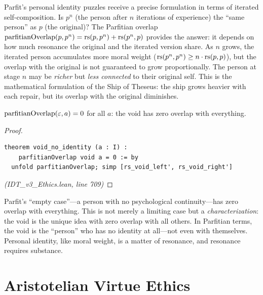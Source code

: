 \begin{remark}
Parfit's personal identity puzzles receive a precise formulation in terms
of iterated self-composition. Is $p^n$ (the person after $n$ iterations of
experience) the ``same person'' as $p$ (the original)? The Parfitian overlap
$\mathrm{parfitianOverlap}(p, p^n) = \mathrm{rs}(p, p^n) + \mathrm{rs}(p^n, p)$ provides
the answer: it depends on how much resonance the original and the iterated
version share. As $n$ grows, the iterated person accumulates more moral
weight ($\mathrm{rs}(p^n, p^n) \geq n \cdot \mathrm{rs}(p,p)$), but the overlap with the
original is not guaranteed to grow proportionally. The person at stage $n$
may be \emph{richer} but \emph{less connected} to their original self.
This is the mathematical formulation of the Ship of Theseus: the ship
grows heavier with each repair, but its overlap with the original diminishes.
\end{remark}

\begin{theorem}
\label{thm:void-no-identity}
$\mathrm{parfitianOverlap}(\varepsilon, a) = 0$ for all $a$: the void has
zero overlap with everything.
\end{theorem}

\begin{proof}
\begin{lstlisting}
theorem void_no_identity (a : I) :
    parfitianOverlap void a = 0 := by
  unfold parfitianOverlap; simp [rs_void_left', rs_void_right']
\end{lstlisting}
\textit{(IDT\_v3\_Ethics.lean, line 709)}
\end{proof}

\begin{interpretation}
Parfit's ``empty case''---a person with no psychological continuity---has
zero overlap with everything. This is not merely a limiting case but
a \emph{characterization}: the void is the unique idea with zero overlap
with all others. In Parfitian terms, the void is the ``person'' who has no
identity at all---not even with themselves. Personal identity, like moral
weight, is a matter of resonance, and resonance requires substance.
\end{interpretation}



\chapter{Aristotelian Virtue Ethics}
\label{ch:virtue}


